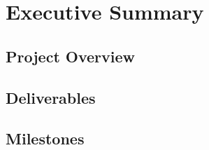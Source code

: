 \section{Executive Summary}

\subsection{Project Overview}
\subsection{Deliverables}
\subsection{Milestones}
